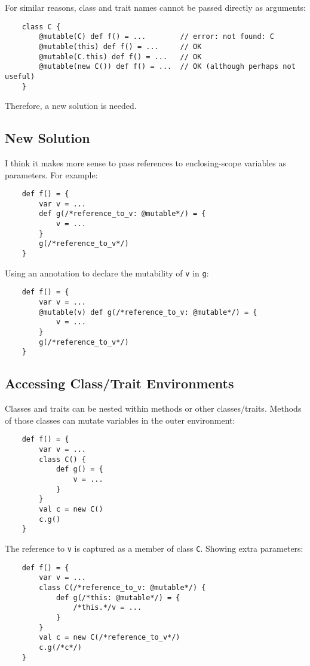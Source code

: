 \documentclass[letterpaper,11pt]{article}
\newcommand{\code}[1]{\lstinline$#1$}
\begin{document}
For similar reasons, class and trait names cannot be passed directly as arguments:

\begin{lstlisting}
	class C {
		@mutable(C) def f() = ...        // error: not found: C
		@mutable(this) def f() = ...     // OK
		@mutable(C.this) def f() = ...   // OK
		@mutable(new C()) def f() = ...  // OK (although perhaps not useful)
	}
\end{lstlisting}

Therefore, a new solution is needed.

\subsection{New Solution}

I think it makes more sense to pass references to enclosing-scope variables as parameters.
For example:

\begin{lstlisting}
	def f() = {
		var v = ...
		def g(/*reference_to_v: @mutable*/) = {
			v = ...
		}
		g(/*reference_to_v*/)
	}
\end{lstlisting}

Using an annotation to declare the mutability of \code{v} in \code{g}:

\begin{lstlisting}
	def f() = {
		var v = ...
		@mutable(v) def g(/*reference_to_v: @mutable*/) = {
			v = ...
		}
		g(/*reference_to_v*/)
	}
\end{lstlisting}


\subsection{Accessing Class/Trait Environments}

Classes and traits can be nested within methods or other classes/traits.
Methods of those classes can mutate variables in the outer environment:

\begin{lstlisting}
	def f() = {
		var v = ...
		class C() {
			def g() = {
				v = ...
			}
		}
		val c = new C()
		c.g()
	}
\end{lstlisting}


The reference to \code{v} is captured as a member of class \code{C}.
Showing extra parameters:

\begin{lstlisting}
	def f() = {
		var v = ...
		class C(/*reference_to_v: @mutable*/) {
			def g(/*this: @mutable*/) = {
				/*this.*/v = ...
			}
		}
		val c = new C(/*reference_to_v*/)
		c.g(/*c*/)
	}
\end{lstlisting}
\end{document}
